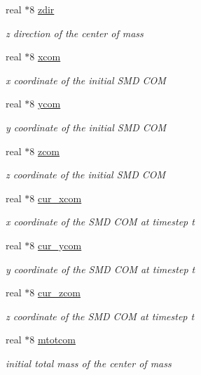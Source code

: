 \begin{DoxyCompactItemize}
real $\ast$8 \hyperlink{classmsmd_a03065d009523da9f2881234a34921999}{zdir}
\begin{DoxyCompactList}\small\item\em z direction of the center of mass \end{DoxyCompactList}\item 
real $\ast$8 \hyperlink{classmsmd_aeae9f59cff9e8a4b11066ba325492d92}{xcom}
\begin{DoxyCompactList}\small\item\em x coordinate of the initial S\-M\-D C\-O\-M \end{DoxyCompactList}\item 
real $\ast$8 \hyperlink{classmsmd_ae92757e8de6f57ff77289f5220eda460}{ycom}
\begin{DoxyCompactList}\small\item\em y coordinate of the initial S\-M\-D C\-O\-M \end{DoxyCompactList}\item 
real $\ast$8 \hyperlink{classmsmd_abe66459722303008741f916ed003751a}{zcom}
\begin{DoxyCompactList}\small\item\em z coordinate of the initial S\-M\-D C\-O\-M \end{DoxyCompactList}\item 
real $\ast$8 \hyperlink{classmsmd_a9b24104b4d00119969ff95f03e0a68f9}{cur\-\_\-xcom}
\begin{DoxyCompactList}\small\item\em x coordinate of the S\-M\-D C\-O\-M at timestep t \end{DoxyCompactList}\item 
real $\ast$8 \hyperlink{classmsmd_aef410996fee34e772a7840d5cdb7ab1c}{cur\-\_\-ycom}
\begin{DoxyCompactList}\small\item\em y coordinate of the S\-M\-D C\-O\-M at timestep t \end{DoxyCompactList}\item 
real $\ast$8 \hyperlink{classmsmd_ae554a126168530ae9e10a604cccf37ea}{cur\-\_\-zcom}
\begin{DoxyCompactList}\small\item\em z coordinate of the S\-M\-D C\-O\-M at timestep t \end{DoxyCompactList}\item 
real $\ast$8 \hyperlink{classmsmd_a52bb0011757c20b7d8f11c546beeb021}{mtotcom}
\begin{DoxyCompactList}\small\item\em initial total mass of the center of mass \end{DoxyCompactList}\item 

\end{DoxyCompactItemize}
